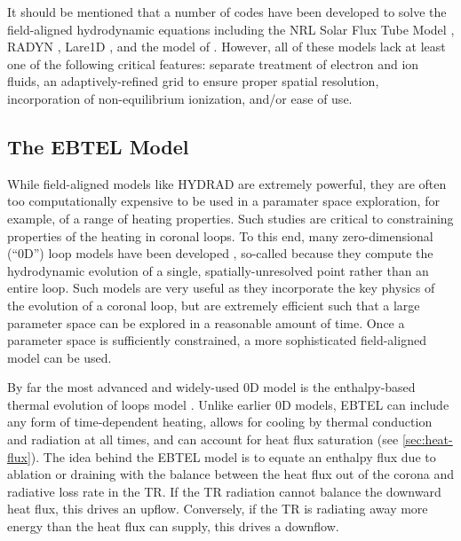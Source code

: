 It should be mentioned that a number of codes have been developed to solve the field-aligned hydrodynamic equations including the NRL Solar Flux Tube Model \citep{mariska_numerical_1989,warren_evolving_2003}, RADYN \citep{allred_unified_2015}, Lare1D \citep{johnston_new_2017}, and the model of \citet{mikic_importance_2013}. However, all of these models lack at least one of the following critical features: separate treatment of electron and ion fluids, an adaptively-refined grid to ensure proper spatial resolution, incorporation of non-equilibrium ionization, and/or ease of use. 

\subsection{The EBTEL Model}\label{sec:ebtel}


While field-aligned models like HYDRAD are extremely powerful, they are often too computationally expensive to be used in a paramater space exploration, for example, of a range of heating properties. Such studies are critical to constraining properties of the heating in coronal loops. To this end, many zero-dimensional (``0D'') loop models have been developed \citep[e.g.][]{kuin_thermal_1982,fisher_equation_1990,kopp_coronal_1993,cargill_implications_1994,aschwanden_hydrodynamic_2009}, so-called because they compute the hydrodynamic evolution of a single, spatially-unresolved point rather than an entire loop. Such models are very useful as they incorporate the key physics of the evolution of a coronal loop, but are extremely efficient such that a large parameter space can be explored in a reasonable amount of time. Once a parameter space is sufficiently constrained, a more sophisticated field-aligned model can be used.

By far the most advanced and widely-used 0D model is the enthalpy-based thermal evolution of loops model \citep[EBTEL,][]{klimchuk_highly_2008}. Unlike earlier 0D models, EBTEL can include any form of time-dependent heating, allows for cooling by thermal conduction and radiation at all times, and can account for heat flux saturation (see \autoref{sec:heat-flux}). The idea behind the EBTEL model is to equate an enthalpy flux due to ablation or draining with the balance between the heat flux out of the corona and radiative loss rate in the TR. If the TR radiation cannot balance the downward heat flux, this drives an upflow. Conversely, if the TR is radiating away more energy than the heat flux can supply, this drives a downflow.

